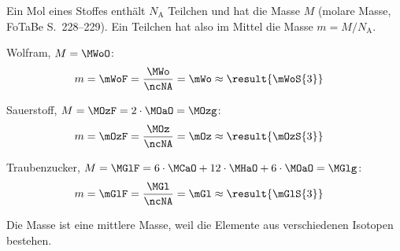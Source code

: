 Ein Mol eines Stoffes enthält $N_\text{A}$ Teilchen und hat die Masse $M$ (molare Masse, FoTaBe S.~228--229). Ein Teilchen hat also im Mittel die Masse $m = M/N_\text{A}$.
\begin{abcliste}
\abc Wolfram, $M = \MWoO$:
\begin{align}
 m &= \mWoF = \frac{\MWo}{\ncNA} = \mWo \approx \result{\mWoS{3}}
\end{align}

\abc Sauerstoff, $M = \MOzF = 2\cdot\MOaO = \MOzg$:
\begin{align}
 m &= \mOzF = \frac{\MOz}{\ncNA} = \mOz \approx \result{\mOzS{3}}
\end{align}

\abc Traubenzucker, $M = \MGlF = 6\cdot\MCaO+12\cdot\MHaO+6\cdot\MOaO = \MGlg$:
\begin{align}
 m &= \mGlF = \frac{\MGl}{\ncNA} = \mGl \approx \result{\mGlS{3}}
\end{align}
\end{abcliste}
Die Masse ist eine mittlere Masse, weil die Elemente aus verschiedenen Isotopen bestehen.
